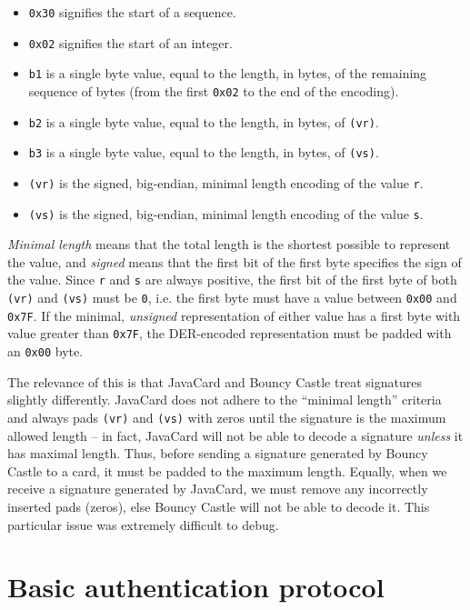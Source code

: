 \documentclass[12pt,a4paper,twoside,openright]{report}
\begin{document}
\begin{itemize}
\item \texttt{0x30} signifies the start of a sequence.
\item \texttt{0x02} signifies the start of an integer.
\item \texttt{b1} is a single byte value, equal to the length, in bytes, of the remaining sequence of bytes (from the first \texttt{0x02} to the end of the encoding).
\item \texttt{b2} is a single byte value, equal to the length, in bytes, of \texttt{(vr)}.
\item \texttt{b3} is a single byte value, equal to the length, in bytes, of \texttt{(vs)}.
\item \texttt{(vr)} is the signed, big-endian, minimal length encoding of the value \texttt{r}.
\item \texttt{(vs)} is the signed, big-endian, minimal length encoding of the value \texttt{s}.
\end{itemize}

\noindent
\emph{Minimal length} means that the total length is the shortest possible to represent the value, and \emph{signed} means that the first bit of the first byte specifies the sign of the value. Since \texttt{r} and \texttt{s} are always positive, the first bit of the first byte of both \texttt{(vr)} and \texttt{(vs)} must be \texttt{0}, i.e. the first byte must have a value between \texttt{0x00} and \texttt{0x7F}. If the minimal, \emph{unsigned} representation of either value has a first byte with value greater than \texttt{0x7F}, the DER-encoded representation must be padded with an \texttt{0x00} byte.

The relevance of this is that JavaCard and Bouncy Castle treat signatures slightly differently. JavaCard does not adhere to the ``minimal length'' criteria and always pads \texttt{(vr)} and \texttt{(vs)} with zeros until the signature is the maximum allowed length -- in fact, JavaCard will not be able to decode a signature \emph{unless} it has maximal length. Thus, before sending a signature generated by Bouncy Castle to a card, it must be padded to the maximum length. Equally, when we receive a signature generated by JavaCard, we must remove any incorrectly inserted pads (zeros), else Bouncy Castle will not be able to decode it. This particular issue was extremely difficult to debug.

\section{Basic authentication protocol}
\label{basicauth}
\end{document}
